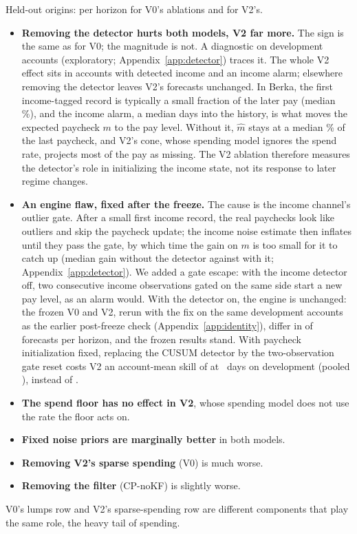\noindent Held-out origins:  per horizon for
V0's ablations and  for V2's.

\begin{itemize}
\item \textbf{Removing the detector hurts both models, V2 far more.} The
  sign is the same as for V0; the magnitude is not. A diagnostic on
  development accounts (exploratory; Appendix~\ref{app:detector}) traces
  it. The whole V2 effect sits in accounts with detected income and an
  income alarm; elsewhere removing the detector leaves V2's forecasts
  unchanged. In Berka, the first income-tagged record is typically a
  small fraction of the later pay (median \%),
  and the income alarm, a median  days
  into the history, is what moves the expected paycheck $m$ to the pay
  level. Without it, $\hat m$ stays at a median
  \% of the last paycheck, and V2's
  cone, whose spending model ignores the spend rate, projects most of the
  pay as missing. The V2 ablation therefore measures the detector's role
  in initializing the income state, not its response to later regime
  changes.
\item \textbf{An engine flaw, fixed after the freeze.} The cause is the
  income channel's outlier gate. After a small first income record, the
  real paychecks look like outliers and skip the paycheck update; the
  income noise estimate then inflates until they pass the gate, by which
  time the gain on $m$ is too small for it to catch up (median gain
   without the
  detector against 
  with it; Appendix~\ref{app:detector}). We added a gate escape: with the
  income detector off, two consecutive income observations gated on the
  same side start a new pay level, as an alarm would. With the detector on,
  the engine is unchanged: the frozen V0 and V2, rerun with the fix on the same
   development accounts as the earlier post-freeze check
  (Appendix~\ref{app:identity}), differ in
   of 
  forecasts per horizon, and the frozen results stand. With paycheck
  initialization fixed, replacing the CUSUM detector by the
  two-observation gate reset costs V2 an account-mean skill of
   at \hC\ days on
  development (pooled ),
  instead of .
\item \textbf{The spend floor has no effect in V2}, whose spending model
  does not use the rate the floor acts on.
\item \textbf{Fixed noise priors are marginally better} in both models.
\item \textbf{Removing V2's sparse spending} (V0) is much worse.
\item \textbf{Removing the filter} (CP-noKF) is slightly worse.
\end{itemize}
V0's lumps row and V2's sparse-spending row are different components that
play the same role, the heavy tail of spending.
